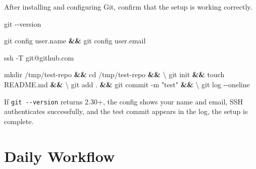 \documentclass[
  letterpaper,
  DIV=11,
  numbers=noendperiod]{scrartcl}
\newenvironment{Shaded}{\begin{snugshade}}{\end{snugshade}}
\newcommand{\AttributeTok}[1]{\textcolor[rgb]{0.40,0.45,0.13}{#1}}
\newcommand{\BuiltInTok}[1]{\textcolor[rgb]{0.00,0.23,0.31}{#1}}
\newcommand{\DataTypeTok}[1]{\textcolor[rgb]{0.68,0.00,0.00}{#1}}
\newcommand{\FunctionTok}[1]{\textcolor[rgb]{0.28,0.35,0.67}{#1}}
\newcommand{\KeywordTok}[1]{\textcolor[rgb]{0.00,0.23,0.31}{\textbf{#1}}}
\newcommand{\NormalTok}[1]{\textcolor[rgb]{0.00,0.23,0.31}{#1}}
\newcommand{\StringTok}[1]{\textcolor[rgb]{0.13,0.47,0.30}{#1}}
\begin{document}
After installing and configuring Git, confirm that the setup is working
correctly.

\begin{Shaded}
\begin{Highlighting}[]
\FunctionTok{git} \AttributeTok{{-}{-}version}
\end{Highlighting}
\end{Shaded}

\begin{Shaded}
\begin{Highlighting}[]
\FunctionTok{git}\NormalTok{ config user.name }\KeywordTok{\&\&} \FunctionTok{git}\NormalTok{ config user.email}
\end{Highlighting}
\end{Shaded}

\begin{Shaded}
\begin{Highlighting}[]
\FunctionTok{ssh} \AttributeTok{{-}T}\NormalTok{ git@github.com}
\end{Highlighting}
\end{Shaded}

\begin{Shaded}
\begin{Highlighting}[]
\FunctionTok{mkdir}\NormalTok{ /tmp/test{-}repo }\KeywordTok{\&\&} \BuiltInTok{cd}\NormalTok{ /tmp/test{-}repo }\KeywordTok{\&\&} \DataTypeTok{\textbackslash{}}
  \FunctionTok{git}\NormalTok{ init }\KeywordTok{\&\&} \FunctionTok{touch}\NormalTok{ README.md }\KeywordTok{\&\&} \DataTypeTok{\textbackslash{}}
  \FunctionTok{git}\NormalTok{ add . }\KeywordTok{\&\&} \FunctionTok{git}\NormalTok{ commit }\AttributeTok{{-}m} \StringTok{"test"} \KeywordTok{\&\&} \DataTypeTok{\textbackslash{}}
  \FunctionTok{git}\NormalTok{ log }\AttributeTok{{-}{-}oneline}
\end{Highlighting}
\end{Shaded}

If \texttt{git\ -\/-version} returns 2.30+, the config shows your name
and email, SSH authenticates successfully, and the test commit appears
in the log, the setup is complete.

\section{Daily Workflow}\label{daily-workflow}
\end{document}
